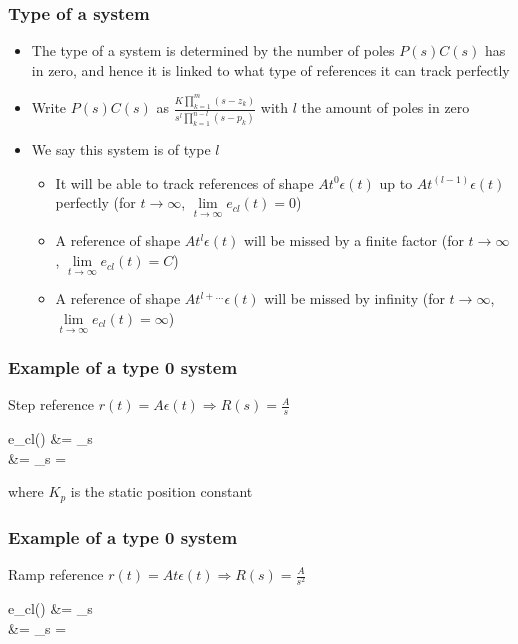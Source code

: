 \begin{frame}
	\frametitle{Type of a system}
	\begin{block}{}
		\begin{itemize}
			\item The type of a system is determined by the number of poles $P(s)C(s)$ has in zero, and hence it is linked to what type of references it can track perfectly
			\item Write $P(s)C(s)$ as $\frac{K \prod_{k=1}^{m} (s-z_k)}{s^l \prod_{k=1}^{n-l} (s-p_k)}$ with $l$ the amount of poles in zero
			\item We say this system is of type $l$
			\begin{itemize}
				\item It will be able to track references of shape $At^0 \epsilon(t)$ up to $At^{(l - 1)} \epsilon(t)$ perfectly (for $t\rightarrow \infty$, $\lim\limits_{t \rightarrow \infty} e_{cl}(t) = 0$)
				\item A reference of shape $At^l \epsilon(t)$ will be missed by a finite factor (for $t\rightarrow \infty$, $\lim\limits_{t \rightarrow \infty} e_{cl}(t) = C$)
				\item A reference of shape $At^{l+...} \epsilon(t)$ will be missed by infinity (for $t\rightarrow \infty$, $\lim\limits_{t \rightarrow \infty} e_{cl}(t) = \infty$)
			\end{itemize}
		\end{itemize}
	\end{block}
\end{frame}

\begin{frame}
	\frametitle{Example of a type 0 system}
		\begin{example}
			{Step reference $r(t) = A \epsilon (t) \Rightarrow R(s) = \frac{A}{s}$}
			\begin{flalign*}
				e_{cl}(\infty) &= \lim\limits_{s }   \\
				&= \lim\limits_{s } 
				= 
			\end{flalign*}
			where $K_p$ is the static position constant
		\end{example}
\end{frame}

\begin{frame}
	\frametitle{Example of a type 0 system}
		\begin{example}
			{Ramp reference $r(t) = At \epsilon (t) \Rightarrow R(s) = \frac{A}{s^2}$}
			\begin{flalign*}
				e_{cl}(\infty) &= \lim\limits_{s }  \frac{A}{s^2} \\
				&= \lim\limits_{s }  \frac{A}{s} = \infty
			\end{flalign*}
		\end{example}
\end{frame}	

